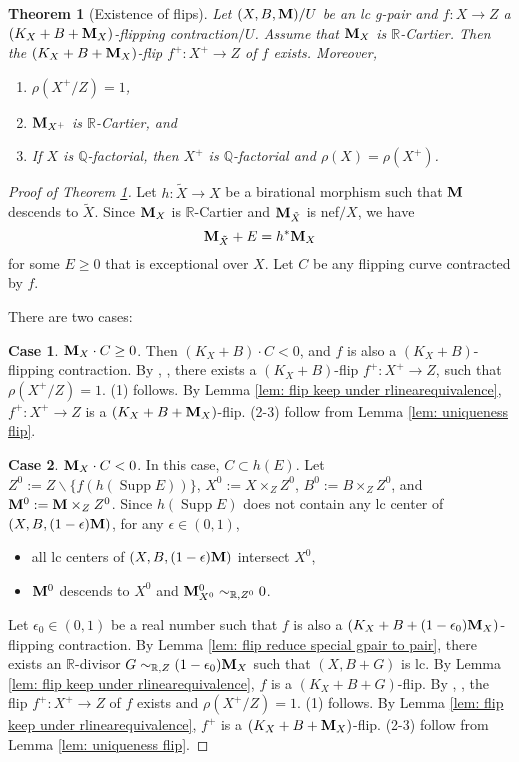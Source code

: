 \documentclass[11pt]{amsart}
\numberwithin{equation}{section}
\newcommand{\Mm}{{\bf{M}}}
\newcommand{\Qq}{\mathbb{Q}}
\newcommand{\Rr}{\mathbb{R}}
\newcommand{\Supp}{\operatorname{Supp}}
\newtheorem{thm}{Theorem}[subsection]
\theoremstyle{definition}
\theoremstyle{definition}
\theoremstyle{definition}
\begin{document}
\begin{thm}[Existence of flips]\label{thm: existence of q-factorial glc flips}
Let $(X,B,\Mm)/U$ be an lc g-pair and $f: X\rightarrow Z$ a $(K_X+B+\Mm_X)$-flipping contraction$/U$. Assume that $\Mm_X$ is $\Rr$-Cartier. Then the $(K_X+B+\Mm_X)$-flip $f^+: X^+\rightarrow Z$ of $f$ exists. Moreover,
\begin{enumerate}
    \item $\rho(X^+/Z)=1$,
    \item $\Mm_{X^+}$ is $\mathbb R$-Cartier, and
    \item If $X$ is $\Qq$-factorial, then $X^+$ is $\mathbb Q$-factorial and $\rho(X)=\rho(X^+)$.
\end{enumerate}
\end{thm}
\begin{proof}[Proof of Theorem \ref{thm: existence of q-factorial glc flips}]
Let $h: \tilde X\rightarrow X$ be a birational morphism such that $\Mm$ descends to $\tilde X$. Since $\Mm_X$ is $\Rr$-Cartier and $\Mm_{\tilde X}$ is nef$/X$, we have
$$\Mm_{\tilde X}+E=h^*\Mm_X$$
for some $E\geq 0$ that is exceptional over $X$. Let $C$ be any flipping curve contracted by $f$. 

There are two cases:

\medskip

\noindent\textbf{Case 1}. $\Mm_X\cdot C\geq 0$. Then $(K_X+B)\cdot C<0$, and $f$ is also a $(K_X+B)$-flipping contraction. By \cite[Corollary 1.2]{Bir12}, \cite[Corollary 1.8]{HX13}, there exists a $(K_X+B)$-flip $f^+: X^+\rightarrow Z$, such that $\rho(X^+/Z)=1$. (1) follows. By Lemma \ref{lem: flip keep under rlinearequivalence}, $f^+: X^+\rightarrow Z$ is a $(K_X+B+\Mm_X)$-flip. (2-3) follow from Lemma \ref{lem: uniqueness flip}.


\medskip

\noindent\textbf{Case 2}. $\Mm_X\cdot C<0$. In this case, $C\subset h(E)$. Let $Z^0:= Z\backslash\{f(h(\Supp E))\}$, $X^0:=X\times_Z Z^0$, $B^0:=B\times_Z Z^0$, and $\Mm^0:=\Mm\times_Z Z^0$. Since $h(\Supp E)$ does not contain any lc center of $(X,B,(1-\epsilon)\Mm)$, for any $\epsilon\in (0,1)$,
\begin{itemize}
\item all lc centers of $(X,B,(1-\epsilon)\Mm)$ intersect $X^0$,
\item $\Mm^0$ descends to $X^0$ and $\Mm^0_{X^0}\sim_{\Rr,Z^0}0$. 
\end{itemize}
Let $\epsilon_0\in (0,1)$ be a real number such that $f$ is also a $(K_X+B+(1-\epsilon_0)\Mm_X)$-flipping contraction. By Lemma \ref{lem: flip reduce special gpair to pair}, there exists an $\Rr$-divisor $G\sim _{\Rr,Z}(1-\epsilon_0)\Mm _X$ such that $(X,B+G)$ is lc. By Lemma \ref{lem: flip keep under rlinearequivalence}, $f$ is a $(K_X+B+G)$-flip. By \cite[Corollary 1.2]{Bir12}, \cite[Corollary 1.8]{HX13}, the flip $f^+: X^+\rightarrow Z$ of $f$ exists and $\rho(X^+/Z)=1$. (1) follows. By Lemma \ref{lem: flip keep under rlinearequivalence}, $f^+$ is a $(K_X+B+\Mm_X)$-flip.  (2-3) follow from Lemma \ref{lem: uniqueness flip}.
\end{proof}
\end{document}
